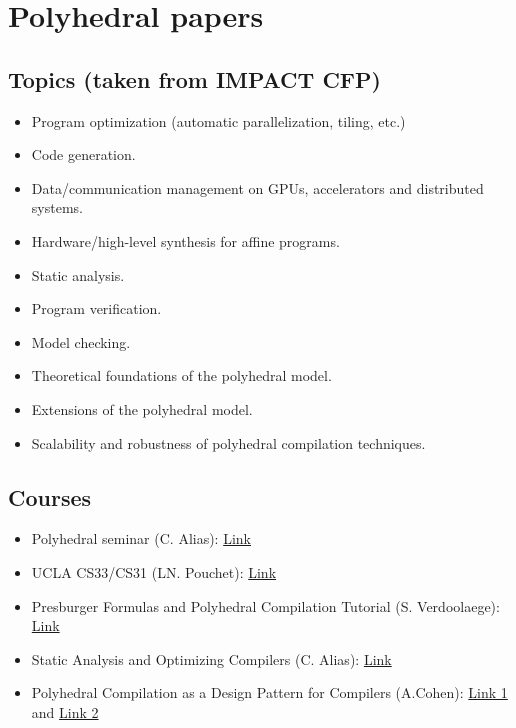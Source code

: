 \documentclass[a4paper, 11pt]{article}
\begin{document}
\section{Polyhedral papers}\label{sec:polly_papers}
\subsection{Topics (taken from IMPACT CFP)}
\begin{itemize}
    \item Program optimization (automatic parallelization, tiling, etc.)
    \item Code generation.
    \item Data/communication management on GPUs, accelerators and distributed systems.
    \item Hardware/high-level synthesis for affine programs.
    \item Static analysis.
    \item Program verification.
    \item Model checking.
    \item Theoretical foundations of the polyhedral model.
    \item Extensions of the polyhedral model.
    \item Scalability and robustness of polyhedral compilation techniques.
\end{itemize}

\subsection{Courses}
\begin{itemize}
    \item Polyhedral seminar (C. Alias): \href{https://gitlab.inria.fr/alias/polyhedral-seminar}{Link}
    \item UCLA CS33/CS31 (LN. Pouchet): \href{https://web.cs.ucla.edu/~pouchet/index.html#lectures}{Link}
    \item Presburger Formulas and Polyhedral Compilation Tutorial (S. Verdoolaege): \href{https://lirias.kuleuven.be/bitstream/123456789/523109/3/polycomp-tutorial-v0.02.pdf}{Link}
    \item Static Analysis and Optimizing Compilers (C. Alias): \href{https://gitlab.inria.fr/alias/cours-m2-cr14}{Link}
    \item Polyhedral Compilation as a Design Pattern for Compilers (A.Cohen): \href{https://www.youtube.com/watch?v=mt6pIpt5Wk0}{Link 1} and \href{https://www.youtube.com/watch?v=3TNT5rFVTUY}{Link 2}
\end{itemize}
\end{document}
